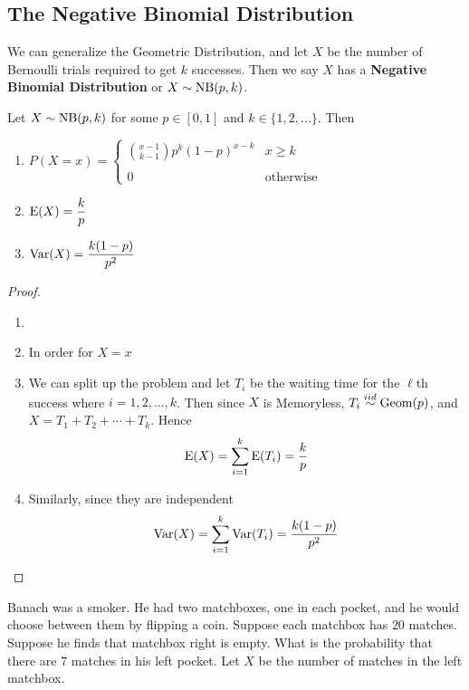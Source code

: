 \documentclass{report}
\begin{document}
\subsection{The Negative Binomial Distribution}
\newcommand{\nbin}{\textup{NB}}
We can generalize the Geometric Distribution, and let $X$ be the number of Bernoulli trials required to get $k$ successes. Then we say $X$ has a \textbf{Negative Binomial Distribution} or $X\sim \nbin(p,k)$.
\begin{theorem}
    Let $X\sim \nbin(p,k)$ for some $p\in[0,1]$ and $k\in\{1,2,...\}$. Then
    \begin{enumerate}
        \item $P(X=x)=\begin{cases}
                \displaystyle\binom {x-1}{k-1} p^{k}(1-p)^{x-k} & x \ge k\\\\
                0 & \text{otherwise}
            \end{cases}$
        \item $\textup{E}(X)=\displaystyle\frac k p$
        \item $\textup{Var}(X)=\displaystyle\frac{k(1-p)}{p^2}$
    \end{enumerate}

    \begin{proof}
    \begin{enumerate}
        \item[]
        \item In order for $X=x$
        \item We can split up the problem and let $T_i$ be the waiting time for the $\ell$th success where $i=1,2,...,k$. Then since $X$ is Memoryless, $T_i\overset{iid}\sim \text{Geom}(p)$, and $X=T_1+T_2+\cdots + T_k$. Hence
        \[
            \textup{E}(X)=\sum_{i=1}^k \textup{E}(T_i)=\frac k p
        \]
        \item Similarly, since they are independent
        \[
            \textup{Var}(X)=\sum_{i=1}^k \textup{Var}(T_i)=\frac{k(1-p)}{p^2}
        \]
    \end{enumerate}
    \end{proof}
\end{theorem}

Banach was a smoker. He had two matchboxes, one in each pocket, and he would choose between them by flipping a coin. 
Suppose each matchbox has $20$ matches. Suppose he finds that matchbox right is empty. What is the probability that there are 7 matches in his left pocket. Let $X$ be the number of matches in the left matchbox. 
\end{document}
